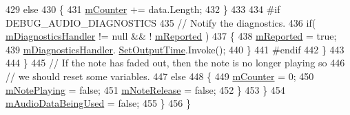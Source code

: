 \begin{DoxyCode}
429                         \textcolor{keywordflow}{else}
430                         \{
431                             \hyperlink{group___n_o_o_priv_var_ga5dca97be8d58837ace4ea6f4a972b20a}{mCounter} += data.Length;
432                         \}
433 
434 \textcolor{preprocessor}{                        #if DEBUG\_AUDIO\_DIAGNOSTICS}
435                             \textcolor{comment}{// Notify the diagnostics.}
436                             \textcolor{keywordflow}{if}( \hyperlink{group___n_o_o_priv_var_gacd4376d2314caafc831cc049e9ca58d8}{mDiagnosticsHandler} != null && !
      \hyperlink{group___n_o_o_priv_var_gafa20525b5515ab62d109f44ab45fba21}{mReported} )
437                             \{
438                                 \hyperlink{group___n_o_o_priv_var_gafa20525b5515ab62d109f44ab45fba21}{mReported} = \textcolor{keyword}{true};
439                                 \hyperlink{group___n_o_o_priv_var_gacd4376d2314caafc831cc049e9ca58d8}{mDiagnosticsHandler}.
      \hyperlink{group___audio_testing_a6360e6098323b921b4a1b306914d06ef}{SetOutputTime}.Invoke();
440                             \}
441 \textcolor{preprocessor}{                        #endif}
442                     \}
443 
444                 \}
445                 \textcolor{comment}{// If the note has faded out, then the note is no longer playing so}
446                 \textcolor{comment}{// we should reset some variables.}
447                 \textcolor{keywordflow}{else}
448                 \{
449                     \hyperlink{group___n_o_o_priv_var_ga5dca97be8d58837ace4ea6f4a972b20a}{mCounter} = 0;
450                     \hyperlink{group___n_o_o_priv_var_ga4417170b8fa977f05a0b4cd0d16412fd}{mNotePlaying} = \textcolor{keyword}{false};
451                     \hyperlink{group___n_o_o_priv_var_ga88bfcc80d0cd20c81cd89d19d3231b84}{mNoteRelease} = \textcolor{keyword}{false};
452                 \}
453             \}
454             \hyperlink{group___n_o_o_priv_var_ga1efa96121f085b27c7d9e8725f90a336}{mAudioDataBeingUsed} = \textcolor{keyword}{false};
455         \}
456     \}
\end{DoxyCode}
